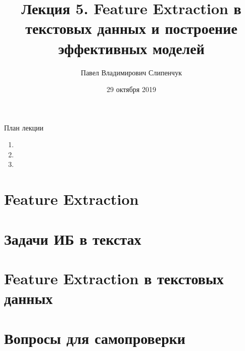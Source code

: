 


\title{Лекция 5. Feature Extraction в текстовых данных и построение эффективных моделей}

\date{29 октября 2019}
\author{Павел Владимирович Слипенчук }


  \maketitle
    
\begin{frame}{План лекции}
    \begin{enumerate}
    	\item {}
		\item {}
		\item {}
	\end{enumerate}
\end{frame}

\section{Feature Extraction}\label{section:fe}

\section{Задачи ИБ в текстах}\label{section:text_tasks}


\section{Feature Extraction в текстовых данных}\label{section:texts_fe}


\section{Вопросы для самопроверки}


